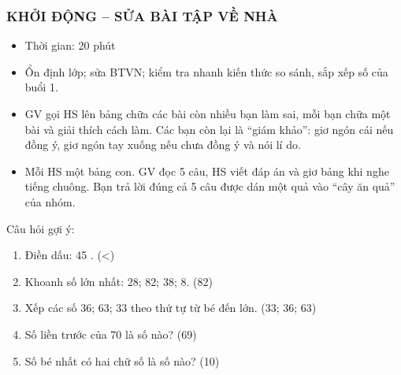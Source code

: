 \documentclass[../main.tex]{subfiles}
\begin{document}
\subsubsection{KHỞI ĐỘNG -- SỬA BÀI TẬP VỀ NHÀ}
\begin{hd}
    \begin{itemize}
        \item Thời gian: 20 phút
        \item Ổn định lớp; sửa BTVN; kiểm tra nhanh kiến thức so sánh, sắp xếp số của buổi 1.
    \end{itemize}
\end{hd}
\begin{itemize}
    \item GV gọi HS lên bảng chữa các bài còn nhiều bạn làm sai, mỗi bạn chữa một bài và giải thích cách làm. Các bạn còn lại là “giám khảo”: giơ ngón cái nếu đồng ý, giơ ngón tay xuống nếu chưa đồng ý và nói lí do.
\end{itemize}
\begin{itemize}
    \item Mỗi HS một bảng con. GV đọc 5 câu, HS viết đáp án và giơ bảng khi nghe tiếng chuông. Bạn trả lời đúng cả 5 câu được dán một quả vào “cây ăn quả” của nhóm.
\end{itemize}
\begin{vd}
    Câu hỏi gợi ý:
    \begin{enumerate}
        \item Điền dấu: 45 . \hfill (\textless)
        \item Khoanh số lớn nhất: 28; 82; 38; 8. \hfill (82)
        \item Xếp các số 36; 63; 33 theo thứ tự từ bé đến lớn. \hfill (33; 36; 63)
        \item Số liền trước của 70 là số nào? \hfill (69)
        \item Số bé nhất có hai chữ số là số nào? \hfill (10)
    \end{enumerate}
\end{vd}

\end{document}
